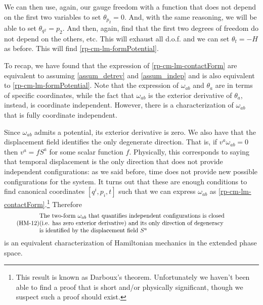 We can then use, again, our gauge freedom with a function that does not depend on the first two variables to set $\theta_{p_2} = 0$. And, with the same reasoning, we will be able to set $\theta_{q^2} = p_2$. And then, again, find that the first two degrees of freedom do not depend on the others, etc. This will exhaust all d.o.f. and we can set $\theta_t = -H$ as before. This will find \ref{rp-cm-lm-formPotential}.

To recap, we have found that the expression of \ref{rp-cm-lm-contactForm} are equivalent to assuming \ref{assum_detrev} and \ref{assum_indep} and is also equivalent to \ref{rp-cm-lm-formPotential}. Note that the expression of $\omega_{ab}$ and $\theta_a$ are in terms of specific coordinates, while the fact that $\omega_{ab}$ is the exterior derivative of $\theta_a$, instead, is coordinate independent. However, there is a characterization of $\omega_{ab}$ that is fully coordinate independent.

Since $\omega_{ab}$ admits a potential, its exterior derivative is zero. We also have that the displacement field identifies the only degenerate direction. That is, if $v^a\omega_{ab} = 0$ then $v^a = f S^a$ for some scalar function $f$. Physically, this corresponds to saying that temporal displacement is the only direction that does not provide independent configurations: as we said before, time does not provide new possible configurations for the system. It turns out that these are enough conditions to find canonical coordinates $[ q^i, p_i, t]$ such that we can express $\omega_{ab}$ as \ref{rp-cm-lm-contactForm}.\footnote{This result is known as Darboux's theorem. Unfortunately we haven't been able to find a proof that is short and/or physically significant, though we suspect such a proof should exist.} Therefore
\begin{equation}\label{rp-cm-lm-condSymplecticFormDef}
	\tag{HM-12}
	\parbox{5in}{The two-form $\omega_{ab}$ that quantifies independent configurations is closed \\ (i.e. has zero exterior derivative)  and its only direction of degeneracy \\ is identified by the displacement field $S^a$}
\end{equation}
is an equivalent characterization of Hamiltonian mechanics in the extended phase space.


